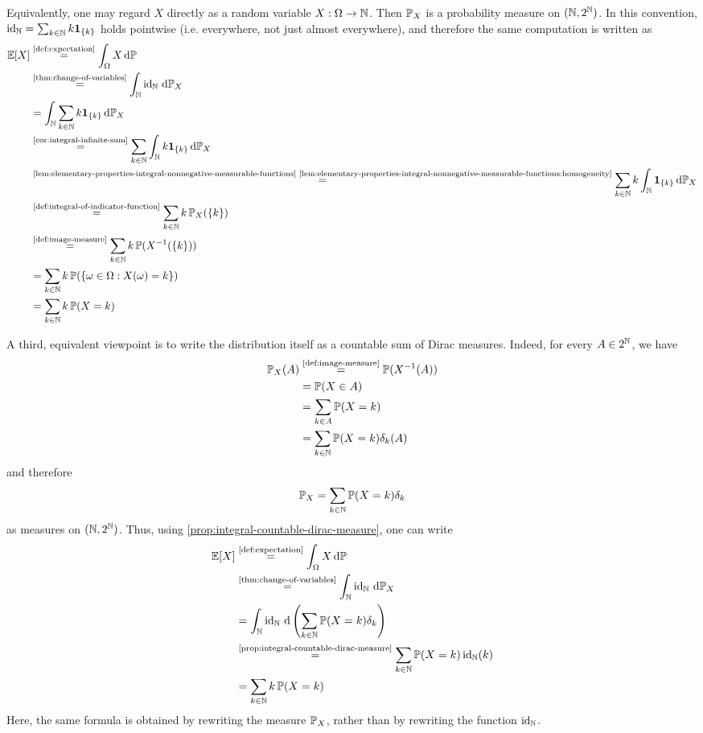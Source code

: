 \begin{remark}
Equivalently, one may regard $X$ directly as a random variable
\(
X : \Omega \to \mathbb{N}
\).
Then $\mathbb{P}_X$ is a probability measure on $(\mathbb{N},2^{\mathbb{N}})$.
In this convention, $\operatorname{id}_{\mathbb{N}} = \sum_{k\in\mathbb{N}} k \mathbf{1}_{\{k\}}$ holds pointwise (i.e. everywhere, not just almost everywhere), and therefore
the same computation is written as
{\allowdisplaybreaks
\begin{align*}
\Exp[X]
&\overset{\text{\autoref{def:expectation}}}{=}
\int_{\Omega} X\,\dif\Prob \\
&\overset{\text{\autoref{thm:change-of-variables}}}{=}
\int_{\N} \id_{\N}\,\dif\Prob_X \\
&=
\int_{\N}
\sum_{k\in\N} k \ind_{\{k\}}
\,\dif\Prob_X \\
&\overset{\text{\autoref{cor:integral-infinite-sum}}}{=}
\sum_{k\in\N}
\int_{\N} k \ind_{\{k\}}\,\dif\Prob_X \\
&\overset{\text{\autoref{lem:elementary-properties-integral-nonnegative-measurable-functions} \ref{lem:elementary-properties-integral-nonnegative-measurable-functions:homogeneity}}}{=}
\sum_{k\in\N}
k \int_{\N} \ind_{\{k\}}\,\dif\Prob_X \\
&\overset{\text{\autoref{def:integral-of-indicator-function}}}{=}
\sum_{k\in\N} k\,\Prob_X(\{k\}) \\
&\overset{\text{\autoref{def:image-measure}}}{=}
\sum_{k\in\N} k\,\Prob(X^{-1}(\{k\})) \\
&=
\sum_{k\in\N} k\,\Prob(\{\omega\in\Omega : X(\omega)=k\}) \\
&=
\sum_{k\in\N} k\,\Prob(X=k)
\end{align*}
}

A third, equivalent viewpoint is to write the distribution itself as a countable sum of Dirac measures.
Indeed, for every $A \in 2^{\mathbb{N}}$, we have
\[
\begin{aligned}
\Prob_X(A)
&\overset{\text{\autoref{def:image-measure}}}{=}
\Prob(X^{-1}(A)) \\
&=
\Prob(X \in A) \\
&=
\sum_{k\in A}\Prob(X=k) \\
&=
\sum_{k\in\N}\Prob(X=k)\delta_k(A)
\end{aligned}
\]
and therefore
\[
\mathbb{P}_X
=
\sum_{k\in\mathbb{N}}\mathbb{P}(X=k)\delta_k
\]
as measures on $(\mathbb{N},2^{\mathbb{N}})$.
Thus, using \autoref{prop:integral-countable-dirac-measure}, one can write
\[
\begin{aligned}
\Exp[X]
&\overset{\text{\autoref{def:expectation}}}{=}
\int_{\Omega} X\,\dif\Prob \\
&\overset{\text{\autoref{thm:change-of-variables}}}{=}
\int_{\N} \id_{\N}\,\dif\Prob_X \\
&=
\int_{\N} \id_{\N}\,\dif\left(\sum_{k\in\N}\Prob(X=k)\delta_k\right) \\
&\overset{\text{\autoref{prop:integral-countable-dirac-measure}}}{=}
\sum_{k\in\N}\Prob(X=k)\id_{\N}(k) \\
&=
\sum_{k\in\N} k\,\Prob(X=k)
\end{aligned}
\]
Here, the same formula is obtained by rewriting the measure $\mathbb{P}_X$, rather than by rewriting the function $\operatorname{id}_{\mathbb{N}}$.
\end{remark}
